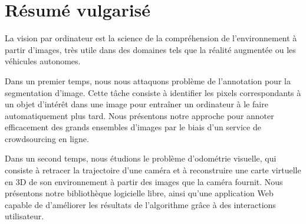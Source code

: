 \section*{Résumé vulgarisé}%
\label{sec:pop-abstract}

La vision par ordinateur est la science de la compréhension de l'environnement à partir d'images,
très utile dans des domaines tels que la réalité augmentée ou les véhicules autonomes.

Dans un premier temps, nous nous attaquons problème de l'annotation pour la segmentation d'image.
Cette tâche consiste à identifier les pixels correspondants
à un objet d'intérêt dans une image pour entraîner un ordinateur à
le faire automatiquement plus tard.
Nous présentons notre approche pour annoter efficacement des grands ensembles d'images
par le biais d'un service de crowdsourcing en ligne.

Dans un second temps, nous étudions le problème d'odométrie visuelle,
qui consiste à retracer la trajectoire d'une caméra et à reconstruire
une carte virtuelle en 3D de son environnement à partir des images que la caméra fournit.
Nous présentons notre bibliothèque logicielle libre, ainsi qu'une application Web capable de
d'améliorer les résultats de l'algorithme grâce à des interactions utilisateur.
